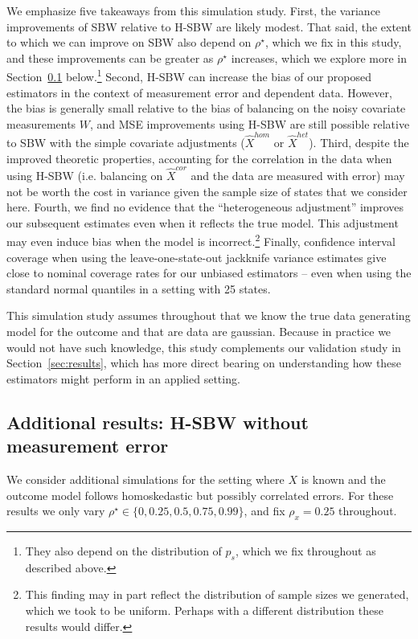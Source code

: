 We emphasize five takeaways from this simulation study. First, the variance improvements of SBW relative to H-SBW are likely modest. That said, the extent to which we can improve on SBW also depend on $\rho^\star$, which we fix in this study, and these improvements can be greater as $\rho^\star$ increases, which we explore more in Section~\ref{appssec:simstudyresults2} below.\footnote{They also depend on the distribution of $p_s$, which we fix throughout as described above.} Second, H-SBW can increase the bias of our proposed estimators in the context of measurement error and dependent data. However, the bias is generally small relative to the bias of balancing on the noisy covariate measurements $W$, and MSE improvements using H-SBW are still possible relative to SBW with the simple covariate adjustments ($\hat{X}^{hom}$ or $\hat{X}^{het}$). Third, despite the improved theoretic properties, accounting for the correlation in the data when using H-SBW (i.e. balancing on $\hat{X}^{cor}$ and the data are measured with error) may not be worth the cost in variance given the sample size of states that we consider here. Fourth, we find no evidence that the ``heterogeneous adjustment'' improves our subsequent estimates even when it reflects the true model. This adjustment may even induce bias when the model is incorrect.\footnote{This finding may in part reflect the distribution of sample sizes we generated, which we took to be uniform. Perhaps with a different distribution these results would differ.} Finally, confidence interval coverage when using the leave-one-state-out jackknife variance estimates give close to nominal coverage rates for our unbiased estimators -- even when using the standard normal quantiles in a setting with 25 states. 

This simulation study assumes throughout that we know the true data generating model for the outcome and that are data are gaussian. Because in practice we would not have such knowledge, this study complements our validation study in Section~\ref{sec:results}, which has more direct bearing on understanding how these estimators might perform in an applied setting.

\subsection{Additional results: H-SBW without measurement error}\label{appssec:simstudyresults2}

We consider additional simulations for the setting where $X$ is known and the outcome model follows homoskedastic but possibly correlated errors. For these results we only vary $\rho^\star \in \{0, 0.25, 0.5, 0.75, 0.99\}$, and fix $\rho_x = 0.25$ throughout. 

